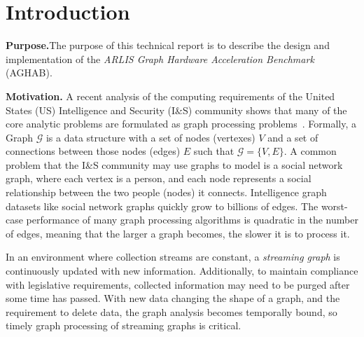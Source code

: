 \section{Introduction}\label{section:introduction}

\par{
    \textbf{Purpose.}The purpose of this technical report is to describe the design and implementation of the \textit{ARLIS Graph Hardware Acceleration Benchmark} (AGHAB).
}

\par{
    \textbf{Motivation.} A recent analysis of the computing requirements of the United States (US) Intelligence and Security (I\&S) community shows that many of the core analytic problems are formulated as graph processing problems~\cite{Regli2022a}.
    Formally, a Graph $\mathcal{G}$ is a data structure with a set of nodes (vertexes) $V$ and a set of connections between those nodes (edges) $E$ such that $\mathcal{G} = \{V,E\}$.
    A common problem that the I\&S community may use graphs to model is a social network graph, where each vertex is a person, and each node represents a social relationship between the two people (nodes) it connects.
    Intelligence graph datasets like social network graphs quickly grow to billions of edges. 
    The worst-case performance of many graph processing algorithms is quadratic in the number of edges, meaning that the larger a graph becomes, the slower it is to process it.} 

\par{
    In an environment where collection streams are constant, a \textit{streaming graph} is continuously updated with new information.
    Additionally, to maintain compliance with legislative requirements, collected information may need to be purged after some time has passed.
    With new data changing the shape of a graph, and the requirement to delete data, the graph analysis becomes temporally bound, so timely graph processing of streaming graphs is critical.} 

